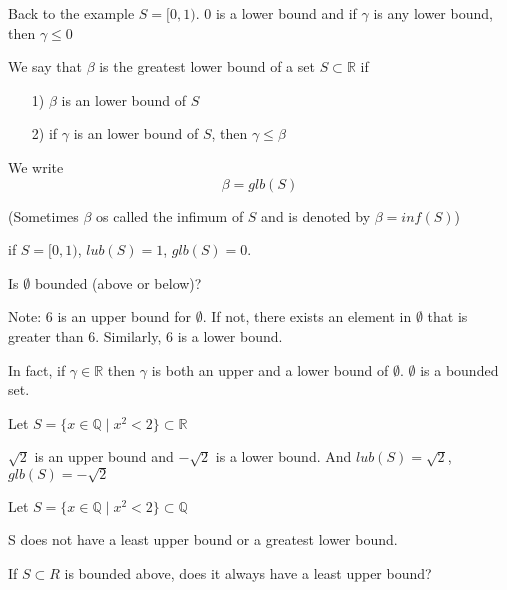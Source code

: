 Back to the example $S=[0,1)$. 0 is a lower bound and if $\gamma$ is any lower bound, then $\gamma \leq 0$



\begin{thm}
We say that $\beta$ is the greatest lower bound of a set $S\subset \mathbb{R}$ if 
\begin{enumerate}
\item[1)] $\beta$ is an lower bound of $S$
\item[2)] if $\gamma$ is an lower bound of $S$, then $\gamma \leq \beta$
\end{enumerate}
 
We write $$\beta = glb(S)$$

(Sometimes $\beta$ os called the infimum of $S$ and is denoted by $\beta = inf(S)$)
\end{thm}

\begin{exmp}
if $S = [0,1)$, $lub(S)=1$, $glb(S)=0$.
\end{exmp}


\begin{note}
Is $\emptyset$ bounded (above or below)?

Note: 6 is an upper bound for $\emptyset$. If not, there exists an element in $\emptyset$ that is greater than 6. Similarly, 6 is a lower bound.

In fact, if $\gamma \in \mathbb{R}$ then $\gamma$ is both an upper and a lower bound of $\emptyset$. $\emptyset$ is a bounded set.
\end{note}

\begin{exmp}
Let $S=\{x\in \mathbb{Q} \mid x^2<2 \} \subset \mathbb{R}$

$\sqrt{2}$ is an upper bound and $-\sqrt{2}$ is a lower bound. And $lub(S) = \sqrt{2}$, $glb(S) = -\sqrt{2}$
\end{exmp}

\begin{exmp}

Let $S=\{x\in \mathbb{Q} \mid x^2<2 \} \subset \mathbb{Q}$

S does not have a least upper bound or a greatest lower bound.

\end{exmp}

\begin{ques}
If $S\subset R$ is bounded above, does it always have a least upper bound?
\end{ques} 

